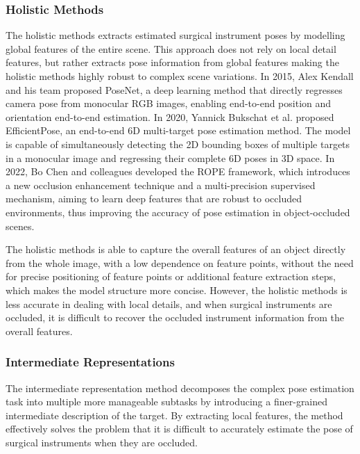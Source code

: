 \documentclass[12pt]{article}
\begin{document}
\subsubsection{Holistic Methods}
The holistic methods extracts estimated surgical instrument poses by modelling global features of the entire scene\cite{fan2024reinforcement}. This approach does not rely on local detail features, but rather extracts pose information from global features making the holistic methods highly robust to complex scene variations. In 2015, Alex Kendall and his team proposed PoseNet, a deep learning method that directly regresses camera pose from monocular RGB images, enabling end-to-end position and orientation end-to-end estimation\cite{kendall2015posenet}. In 2020, Yannick Bukschat et al. proposed EfficientPose, an end-to-end 6D multi-target pose estimation method. The model is capable of simultaneously detecting the 2D bounding boxes of multiple targets in a monocular image and regressing their complete 6D poses in 3D space\cite{bukschat2020efficientpose}. In 2022, Bo Chen and colleagues developed the ROPE framework, which introduces a new occlusion enhancement technique and a multi-precision supervised mechanism, aiming to learn deep features that are robust to occluded environments, thus improving the accuracy of pose estimation in object-occluded scenes\cite{chen2022occlusion}.

The holistic methods is able to capture the overall features of an object directly from the whole image, with a low dependence on feature points, without the need for precise positioning of feature points or additional feature extraction steps, which makes the model structure more concise\cite{chen2022occlusion}. However, the holistic methods is less accurate in dealing with local details, and when surgical instruments are occluded, it is difficult to recover the occluded instrument information from the overall features\cite{watson2014nature}.

\subsubsection{Intermediate Representations}
The intermediate representation method decomposes the complex pose estimation task into multiple more manageable subtasks by introducing a finer-grained intermediate description of the target. By extracting local features, the method effectively solves the problem that it is difficult to accurately estimate the pose of surgical instruments when they are occluded\cite{song2020hybridpose}.
\end{document}
